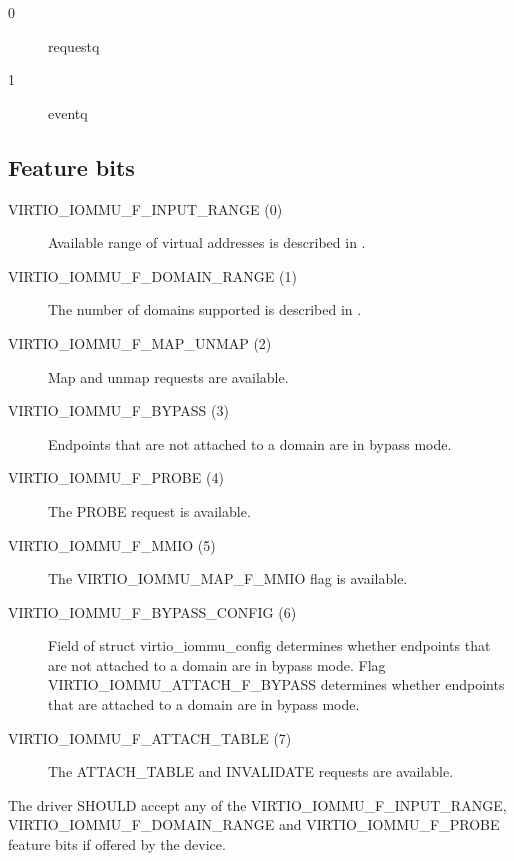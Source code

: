 \begin{description}
\item[0] requestq
\item[1] eventq
\end{description}

\subsection{Feature bits}\label{sec:Device Types / IOMMU Device / Feature bits}

\begin{description}
\item[VIRTIO_IOMMU_F_INPUT_RANGE (0)]
  Available range of virtual addresses is described in
    .

\item[VIRTIO_IOMMU_F_DOMAIN_RANGE (1)]
  The number of domains supported is described in .

\item[VIRTIO_IOMMU_F_MAP_UNMAP (2)]
  Map and unmap requests are available.

\item[VIRTIO_IOMMU_F_BYPASS (3)]
  Endpoints that are not attached to a domain are in bypass mode.

\item[VIRTIO_IOMMU_F_PROBE (4)]
  The PROBE request is available.

\item[VIRTIO_IOMMU_F_MMIO (5)]
  The VIRTIO_IOMMU_MAP_F_MMIO flag is available.

\item[VIRTIO_IOMMU_F_BYPASS_CONFIG (6)]
  Field  of struct virtio_iommu_config determines
  whether endpoints that are not attached to a domain are in
  bypass mode. Flag VIRTIO_IOMMU_ATTACH_F_BYPASS determines
  whether endpoints that are attached to a domain are in bypass
  mode.

\item[VIRTIO_IOMMU_F_ATTACH_TABLE (7)]
  The ATTACH_TABLE and INVALIDATE requests are available.
\end{description}


The driver SHOULD accept any of the VIRTIO_IOMMU_F_INPUT_RANGE,
VIRTIO_IOMMU_F_DOMAIN_RANGE and VIRTIO_IOMMU_F_PROBE feature bits if
offered by the device.

